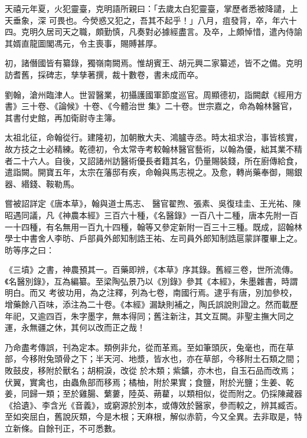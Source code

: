 \begin{pinyinscope}
 天禧元年夏，火犯靈臺，克明語所親曰：「去歲太白犯靈臺，掌歷者悉被降譴，上天垂象，深
 可畏也。今熒惑又犯之，吾其不起乎！」八月，疽發背，卒，年六十四。克明久居司天之職，頗勤慎，凡奏對必據經盡言。及卒，上頗悼惜，遣內侍諭其婿直龍圖閣馮元，令主喪事，賜賻甚厚。



 初，諸僭國皆有纂錄，獨嶺南闕焉。惟胡賓王、胡元興二家纂述，皆不之備。克明訪耆舊，採碑志，孳孳著撰，裁十數卷，書未成而卒。



 劉翰，滄州臨津人。世習醫業，初攝護國軍節度巡官。周顯德初，詣闕獻《經用方書》三十卷、《論候》十卷、《今體治世
 集》二十卷。世宗嘉之，命為翰林醫官，其書付史館，再加衛尉寺主簿。



 太祖北征，命翰從行。建隆初，加朝散大夫、鴻臚寺丞。時太祖求治，事皆核實，故方技之士必精練。乾德初，令太常寺考較翰林醫官藝術，以翰為優，絀其業不精者二十六人。自後，又詔諸州訪醫術優長者籍其名，仍量賜裝錢，所在廚傳給食，遣詣闕。開寶五年，太宗在藩邸有疾，命翰與馬志視之。及愈，轉尚藥奉御，賜銀器、緡錢、鞍勒馬。



 嘗被詔詳定《唐本草》，翰與道士馬志、
 醫官翟煦、張素、吳復珪圭、王光祐、陳昭遇同議，凡《神農本經》三百六十種，《名醫錄》一百八十二種，唐本先附一百一十四種，有名無用一百九十四種，翰等又參定新附一百三十三種。既成，詔翰林學士中書舍人李昉、戶部員外郎知制誥王祐、左司員外郎知制誥扈蒙詳覆畢上之。昉等序之曰：



 《三墳》之書，神農預其一。百藥即辨，《本草》序其錄。舊經三卷，世所流傳。《名醫別錄》，互為編纂。至梁陶弘景乃以《別錄》參其《本經》，朱墨雜書，時謂明白。而又
 考彼功用，為之注釋，列為七卷，南國行焉。逮乎有唐，別加參校，增藥餘八百味，添注為二十卷。《本經》漏缺則補之，陶氏誤說則證之。然而載歷年祀，又逾四百，朱字墨字，無本得同；舊注新注，其文互闕。非聖主撫大同之運，永無疆之休，其何以改而正之哉！



 乃命盡考傳誤，刊為定本。類例非允，從而革焉。至如筆頭灰，兔毫也，而在草部，今移附兔頭骨之下；半天河、地漿，皆水也，亦在草部，今移附土石類之間；敗鼓皮，移附於獸名；胡桐淚，改從
 於木類；紫鑛，亦木也，自玉石品而改焉；伏翼，實禽也，由蟲魚部而移焉；橘柚，附於果實；食鹽，附於光鹽；生姜、乾姜，同歸一類；至於雞腸、蘩蔞，陸英、蒴藋，以類相似，從而附之。仍採陳藏器《拾遺》、李含光《音義》，或窮源於別本，或傳效於醫家，參而較之，辨其臧否。至如突屈白，舊說灰類，今是木根；天麻根，解似赤箭，今又全異。去非取是，特立新條。自餘刊正，不可悉數。




\end{pinyinscope}
